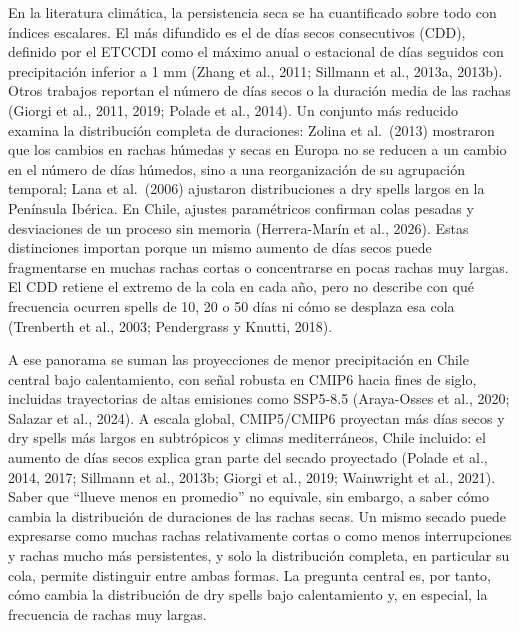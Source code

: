 En la literatura climática, la persistencia seca se ha cuantificado sobre todo con índices escalares. El más difundido es el de días secos consecutivos (CDD), definido por el ETCCDI como el máximo anual o estacional de días seguidos con precipitación inferior a 1 mm (Zhang et al., 2011; Sillmann et al., 2013a, 2013b). Otros trabajos reportan el número de días secos o la duración media de las rachas (Giorgi et al., 2011, 2019; Polade et al., 2014). Un conjunto más reducido examina la distribución completa de duraciones: Zolina et al.~(2013) mostraron que los cambios en rachas húmedas y secas en Europa no se reducen a un cambio en el número de días húmedos, sino a una reorganización de su agrupación temporal; Lana et al.~(2006) ajustaron distribuciones a dry spells largos en la Península Ibérica. En Chile, ajustes paramétricos confirman colas pesadas y desviaciones de un proceso sin memoria (Herrera-Marín et al., 2026). Estas distinciones importan porque un mismo aumento de días secos puede fragmentarse en muchas rachas cortas o concentrarse en pocas rachas muy largas. El CDD retiene el extremo de la cola en cada año, pero no describe con qué frecuencia ocurren spells de 10, 20 o 50 días ni cómo se desplaza esa cola (Trenberth et al., 2003; Pendergrass y Knutti, 2018).

A ese panorama se suman las proyecciones de menor precipitación en Chile central bajo calentamiento, con señal robusta en CMIP6 hacia fines de siglo, incluidas trayectorias de altas emisiones como SSP5-8.5 (Araya-Osses et al., 2020; Salazar et al., 2024). A escala global, CMIP5/CMIP6 proyectan más días secos y dry spells más largos en subtrópicos y climas mediterráneos, Chile incluido: el aumento de días secos explica gran parte del secado proyectado (Polade et al., 2014, 2017; Sillmann et al., 2013b; Giorgi et al., 2019; Wainwright et al., 2021). Saber que ``llueve menos en promedio'' no equivale, sin embargo, a saber cómo cambia la distribución de duraciones de las rachas secas. Un mismo secado puede expresarse como muchas rachas relativamente cortas o como menos interrupciones y rachas mucho más persistentes, y solo la distribución completa, en particular su cola, permite distinguir entre ambas formas. La pregunta central es, por tanto, cómo cambia la distribución de dry spells bajo calentamiento y, en especial, la frecuencia de rachas muy largas.

